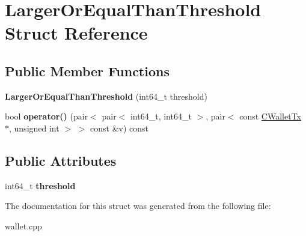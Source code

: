 \hypertarget{struct_larger_or_equal_than_threshold}{}\section{Larger\+Or\+Equal\+Than\+Threshold Struct Reference}
\label{struct_larger_or_equal_than_threshold}
\subsection*{Public Member Functions}
\begin{DoxyCompactItemize}
\item 
\mbox{\label{struct_larger_or_equal_than_threshold_a5005a9c02213bc71bbe2f5322a20bed3}} 
{\bfseries Larger\+Or\+Equal\+Than\+Threshold} (int64\+\_\+t threshold)
\item 
\mbox{\label{struct_larger_or_equal_than_threshold_a804af588f3b41e97949a8659f4003d22}} 
bool {\bfseries operator()} (pair$<$ pair$<$ int64\+\_\+t, int64\+\_\+t $>$, pair$<$ const \mbox{\hyperlink{class_c_wallet_tx}{C\+Wallet\+Tx}} $\ast$, unsigned int $>$ $>$ const \&v) const
\end{DoxyCompactItemize}
\subsection*{Public Attributes}
\begin{DoxyCompactItemize}
\item 
\mbox{\label{struct_larger_or_equal_than_threshold_a2148e08446ee7093ce81b9537b93498e}} 
int64\+\_\+t {\bfseries threshold}
\end{DoxyCompactItemize}


The documentation for this struct was generated from the following file\+:\begin{DoxyCompactItemize}
\item 
wallet.\+cpp\end{DoxyCompactItemize}
